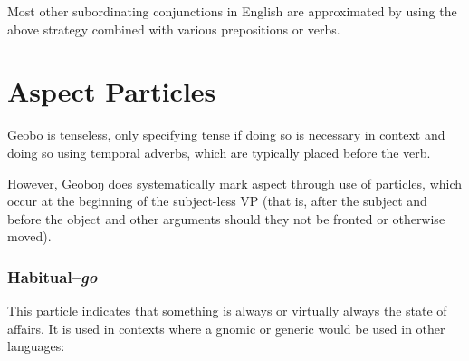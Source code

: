 \documentclass[a4paper,11pt,oneside,openany]{memoir}
\begin{document}

Most other subordinating conjunctions in English are approximated by using the above strategy combined with various prepositions or verbs.



\section{Aspect Particles}

Geobo{\engma} is tenseless, only specifying tense if doing so is necessary in context and doing so using temporal adverbs, which are typically placed before the verb.


However, Geoboŋ does systematically mark aspect through use of particles, which occur at the beginning of the subject-less VP (that is, after the subject and before the object and other arguments should they not be fronted or otherwise moved).


\subsubsection{Habitual--\textit{go}}

This particle indicates that something is always or virtually always the state of affairs. It is used in contexts where a gnomic or generic would be used in other languages:
\end{document}
